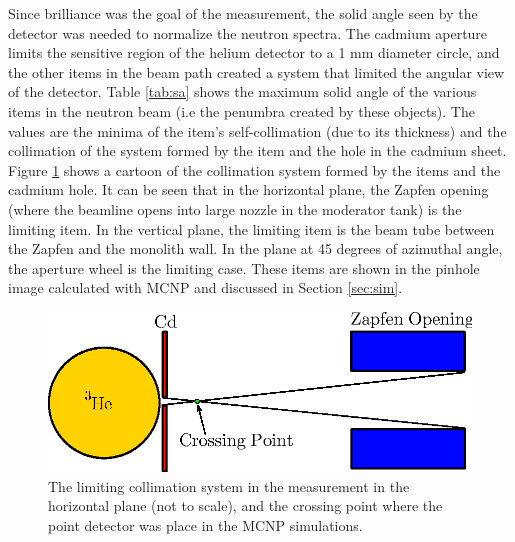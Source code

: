 \documentclass[5p,12pt]{elsarticle}
\begin{document}
Since brilliance was the goal of the measurement, the solid angle seen by the detector was needed to normalize the neutron spectra.  The cadmium aperture limits the sensitive region of the helium detector to a 1 mm diameter circle, and the other items in the beam path created a system that limited the angular view of the detector.  Table \ref{tab:sa} shows the maximum solid angle of the various items in the neutron beam (i.e the penumbra created by these objects).  The values are the minima of the item's self-collimation (due to its thickness) and the collimation of the system formed by the item and the hole in the cadmium sheet.  Figure \ref{fig:solid_angle} shows a cartoon of the collimation system formed by the items and the cadmium hole.  It can be seen that in the horizontal plane, the Zapfen opening (where the beamline opens into large nozzle in the moderator tank) is the limiting item.  In the vertical plane, the limiting item is the beam tube between the Zapfen and the monolith wall.  In the plane at 45 degrees of azimuthal angle, the aperture wheel is the limiting case.  These items are shown in the pinhole image calculated with MCNP and discussed in Section \ref{sec:sim}.

\begin{figure}[h!] 
  \centering
    \includegraphics[width=\columnwidth]{graphics/solid_angle.eps}
     \caption{The limiting collimation system in the measurement in the horizontal plane (not to scale), and the crossing point where the point detector was place in the MCNP simulations. \label{fig:solid_angle}}
\end{figure}
\end{document}
